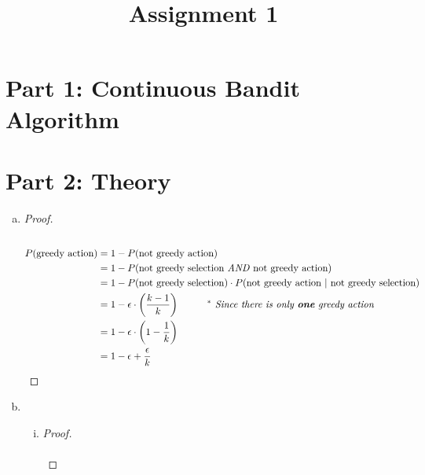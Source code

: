 \documentclass{article}
\title{Assignment 1}
\date{}
\author{}
\newcommand\ddfrac[2]{\frac{\displaystyle #1}{\displaystyle #2}}
\begin{document}
\maketitle
\section*{Part 1: Continuous Bandit Algorithm}
\section*{Part 2: Theory}
\begin{enumerate}[a)]
    \item \begin{proof}
        \renewcommand{\qedsymbol}{$\blacksquare$}
        \hfill\\\\
        \begin{equation*}
            \begin{aligned}
                P(\text{greedy action}) &= 1 - P(\text{not greedy action})\\
                &= 1 - P(\text{not greedy selection \textit{AND} not greedy action})\\
                &= 1 - P(\text{not greedy selection}) \cdot P(\text{not greedy action $|$ not greedy selection})\\
                &= 1 - \epsilon \cdot \left(\ddfrac{k-1}{k}\right) \textit{\hspace{1cm}$^{*}$ Since there is only \textbf{one} greedy action}\\
                &= 1 - \epsilon \cdot \left(1-\ddfrac{1}{k}\right)\\
                &= 1 - \epsilon + \ddfrac{\epsilon}{k}\\
            \end{aligned}
        \end{equation*}
    \end{proof}
    \item  
    \begin{enumerate}[i)]
        \item \begin{proof}
            \renewcommand{\qedsymbol}{$\blacksquare$}
            \hfill\\\\

\end{proof}
\end{enumerate}
\end{enumerate}
\end{document}
